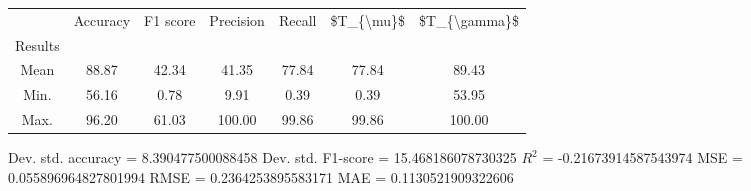 \begin{tabular}{|c|c|c|c|c|c|c|}
\toprule
{} &  Accuracy &  F1 score &  Precision &  Recall &  \$T\_\{\textbackslash mu\}\$ &  \$T\_\{\textbackslash gamma\}\$ \\
Results &           &           &            &         &            &               \\
\hline
Mean    &     88.87 &     42.34 &      41.35 &   77.84 &      77.84 &         89.43 \\
Min.    &     56.16 &      0.78 &       9.91 &    0.39 &       0.39 &         53.95 \\
Max.    &     96.20 &     61.03 &     100.00 &   99.86 &      99.86 &        100.00 \\
\bottomrule
\end{tabular}

 Dev. std. accuracy = 8.390477500088458
 Dev. std. F1-score = 15.468186078730325
 $R^2$ = -0.21673914587543974
 MSE = 0.055896964827801994
 RMSE = 0.2364253895583171
 MAE = 0.1130521909322606